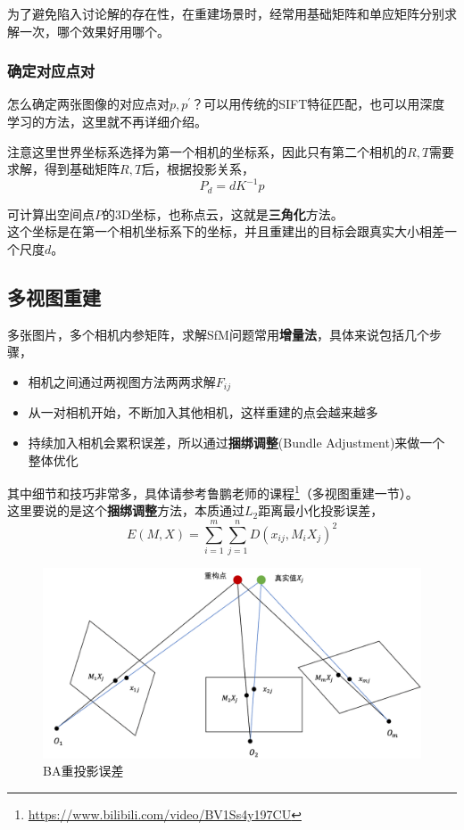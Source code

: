		为了避免陷入讨论解的存在性，在重建场景时，经常用基础矩阵和单应矩阵分别求解一次，哪个效果好用哪个。

	\subsubsection*{确定对应点对}
		怎么确定两张图像的对应点对$p,p^{\prime}$？可以用传统的SIFT特征匹配，也可以用深度学习的方法，这里就不再详细介绍。

	
	注意这里世界坐标系选择为第一个相机的坐标系，因此只有第二个相机的$R,T$需要求解，得到基础矩阵$R,T$后，根据投影关系，
	$$
		P_d = dK^{-1}p
	$$

	可计算出空间点$P$的3D坐标，也称点云，这就是\textbf{三角化}方法。\\

	这个坐标是在第一个相机坐标系下的坐标，并且重建出的目标会跟真实大小相差一个尺度$d$。

	\subsection{多视图重建}
		多张图片，多个相机内参矩阵，求解SfM问题常用\textbf{增量法}，具体来说包括几个步骤，
	
	\begin{itemize}
		\item 相机之间通过两视图方法两两求解$F_{ij}$
		\item 从一对相机开始，不断加入其他相机，这样重建的点会越来越多
		\item 持续加入相机会累积误差，所以通过\textbf{捆绑调整}(Bundle Adjustment)来做一个整体优化
	\end{itemize}

	其中细节和技巧非常多，具体请参考鲁鹏老师的课程\footnote{\url{https://www.bilibili.com/video/BV1Ss4y197CU}}（多视图重建一节）。\\

	这里要说的是这个\textbf{捆绑调整}方法，本质通过$L_2$距离最小化投影误差，
	$$
		E(M,X) = \sum_{i=1}^m \sum_{j=1}^n D\left(x_{ij}, M_iX_j\right)^2
	$$

	\begin{figure}[H]
		\begin{center}
			\includegraphics[width=\textwidth]{images/ba.png}
		\end{center}
		\caption{BA重投影误差}
	\end{figure}

